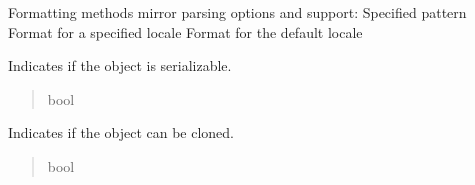 \documentclass[letterpaper,10pt,english]{sphinxmanual}
\begin{document}
\begin{fulllineitems}
\sphinxAtStartPar
Formatting methods mirror parsing options and support:
\sphinxhyphen{} Specified pattern
\sphinxhyphen{} Format for a specified locale
\sphinxhyphen{} Format for the default locale

\begin{fulllineitems}
\label{\detokenize{apache_commons_validator_python.routines:apache_commons_validator_python.routines.time_validator.TimeValidator.serializable}}
\pysigstartsignatures
{}
\pysigstopsignatures
\sphinxAtStartPar
Indicates if the object is serializable.
\begin{quote}\begin{description}
\sphinxAtStartPar
bool

\end{description}\end{quote}

\end{fulllineitems}


\begin{fulllineitems}
\label{\detokenize{apache_commons_validator_python.routines:apache_commons_validator_python.routines.time_validator.TimeValidator.cloneable}}
\pysigstartsignatures
{}
\pysigstopsignatures
\sphinxAtStartPar
Indicates if the object can be cloned.
\begin{quote}\begin{description}
\sphinxAtStartPar
bool

\end{description}\end{quote}

\end{fulllineitems}



\end{fulllineitems}
\end{document}
